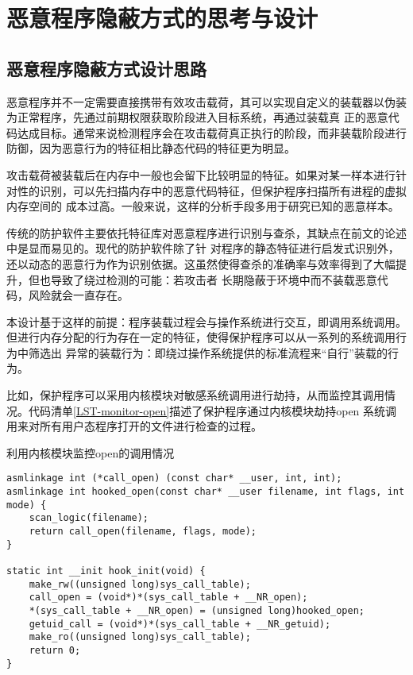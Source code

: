 \chapter{恶意程序隐蔽方式的思考与设计}

\section{恶意程序隐蔽方式设计思路}

恶意程序并不一定需要直接携带有效攻击载荷，其可以实现自定义的装载器以伪装为正常程序，先通过前期权限获取阶段进入目标系统，再通过装载真
正的恶意代码达成目标。通常来说检测程序会在攻击载荷真正执行的阶段，而非装载阶段进行防御，因为恶意行为的特征相比静态代码的特征更为明显。

攻击载荷被装载后在内存中一般也会留下比较明显的特征。如果对某一样本进行针对性的识别，可以先扫描内存中的恶意代码特征，但保护程序扫描所有进程的虚拟内存空间的
成本过高。一般来说，这样的分析手段多用于研究已知的恶意样本。

传统的防护软件主要依托特征库对恶意程序进行识别与查杀，其缺点在前文的论述中是显而易见的。现代的防护软件除了针
对程序的静态特征进行启发式识别外，还以动态的恶意行为作为识别依据。这虽然使得查杀的准确率与效率得到了大幅提升，但也导致了绕过检测的可能：若攻击者
长期隐蔽于环境中而不装载恶意代码，风险就会一直存在。

本设计基于这样的前提：程序装载过程会与操作系统进行交互，即调用系统调用。但进行内存分配的行为存在一定的特征，使得保护程序可以从一系列的系统调用行为中筛选出
异常的装载行为：即绕过操作系统提供的标准流程来“自行”装载的行为。

比如，保护程序可以采用内核模块对敏感系统调用进行劫持，从而监控其调用情况。代码清单\ref{LST-monitor-open}描述了保护程序通过内核模块劫持open
系统调用来对所有用户态程序打开的文件进行检查的过程。

\begin{listing}
\caption{利用内核模块监控open的调用情况}
\label{LST-monitor-open}
\begin{verbatim}
asmlinkage int (*call_open) (const char* __user, int, int);
asmlinkage int hooked_open(const char* __user filename, int flags, int mode) {
    scan_logic(filename);
    return call_open(filename, flags, mode);
}
    
static int __init hook_init(void) {
    make_rw((unsigned long)sys_call_table);
    call_open = (void*)*(sys_call_table + __NR_open);
    *(sys_call_table + __NR_open) = (unsigned long)hooked_open;
    getuid_call = (void*)*(sys_call_table + __NR_getuid);
    make_ro((unsigned long)sys_call_table);
    return 0;
}
\end{verbatim}
\end{listing}

